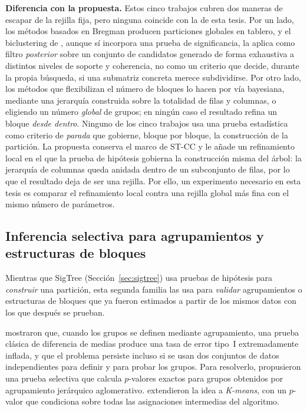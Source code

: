 \textbf{Diferencia con la propuesta.} Estos cinco trabajos cubren dos
maneras de escapar de la rejilla fija, pero ninguna coincide con la de esta
tesis. Por un lado, los métodos basados en Bregman producen particiones
globales en tablero, y el biclustering de \cite{Neves2022}, aunque sí
incorpora una prueba de significancia, la aplica como filtro
\emph{posterior} sobre un conjunto de candidatos generado de forma
exhaustiva a distintos niveles de soporte y coherencia, no como un criterio
que decide, durante la propia búsqueda, si una submatriz concreta merece
subdividirse. Por otro lado, los métodos que flexibilizan el número de
bloques lo hacen por vía bayesiana, mediante una jerarquía construida sobre
la totalidad de filas y columnas, o eligiendo un número \emph{global} de
grupos; en ningún caso el resultado refina un bloque \emph{desde dentro}.
Ninguno de los cinco trabajos usa una prueba estadística como criterio de
\emph{parada} que gobierne, bloque por bloque, la construcción de la
partición. La propuesta conserva el marco de \ac{ST-CC} y le añade un
refinamiento local en el que la prueba de hipótesis gobierna la
construcción misma del árbol: la jerarquía de columnas queda anidada dentro
de un subconjunto de filas, por lo que el resultado deja de ser una
rejilla. Por ello, un experimento necesario en esta tesis es comparar el
refinamiento local contra una rejilla global más fina con el mismo número
de parámetros.

\subsection{Inferencia selectiva para agrupamientos y estructuras de bloques}
\label{sec:ea_inferencia}

Mientras que SigTree (Sección~\ref{sec:sigtree}) usa pruebas de
hipótesis para \emph{construir} una partición, esta segunda familia las usa
para \emph{validar} agrupamientos o estructuras de bloques que ya fueron
estimados a partir de los mismos datos con los que después se prueban.

\cite{Gao2024} mostraron que, cuando los grupos se definen mediante
agrupamiento, una prueba clásica de diferencia de medias produce una tasa de
error tipo~I extremadamente inflada, y que el problema persiste incluso si
se usan dos conjuntos de datos independientes para definir y para probar los
grupos. Para resolverlo, propusieron una prueba selectiva que calcula
$p$-valores exactos para grupos obtenidos por agrupamiento jerárquico
aglomerativo. \cite{Chen2023} extendieron la idea a \textit{K-means}, con un
$p$-valor que condiciona sobre todas las asignaciones intermedias del
algoritmo.

